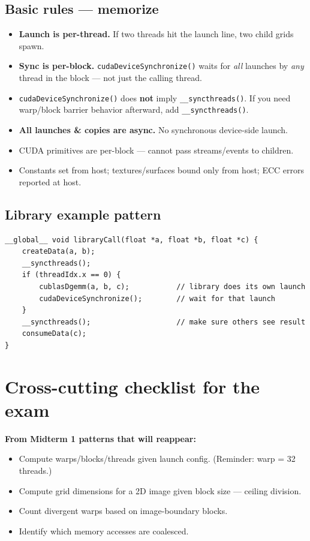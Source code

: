 \documentclass[10pt]{article}
\begin{document}
\subsection*{Basic rules — memorize}
\begin{keybox}
\begin{itemize}
  \item \textbf{Launch is per-thread.} If two threads hit the launch line, two child grids spawn.
  \item \textbf{Sync is per-block.} \texttt{cudaDeviceSynchronize()} waits for \emph{all} launches by \emph{any} thread in the block — not just the calling thread.
  \item \texttt{cudaDeviceSynchronize()} does \textbf{not} imply \texttt{\_\_syncthreads()}. If you need warp/block barrier behavior afterward, add \texttt{\_\_syncthreads()}.
  \item \textbf{All launches \& copies are async.} No synchronous device-side launch.
  \item CUDA primitives are per-block — cannot pass streams/events to children.
  \item Constants set from host; textures/surfaces bound only from host; ECC errors reported at host.
\end{itemize}
\end{keybox}

\subsection*{Library example pattern}
\begin{lstlisting}
__global__ void libraryCall(float *a, float *b, float *c) {
    createData(a, b);
    __syncthreads();
    if (threadIdx.x == 0) {
        cublasDgemm(a, b, c);           // library does its own launch
        cudaDeviceSynchronize();        // wait for that launch
    }
    __syncthreads();                    // make sure others see result
    consumeData(c);
}
\end{lstlisting}

\hrulefill

\section*{Cross-cutting checklist for the exam}

\textbf{From Midterm 1 patterns that will reappear:}
\begin{itemize}
  \item Compute warps/blocks/threads given launch config. (Reminder: warp = 32 threads.)
  \item Compute grid dimensions for a 2D image given block size — ceiling division.
  \item Count divergent warps based on image-boundary blocks.
  \item Identify which memory accesses are coalesced.
\end{itemize}
\end{document}
